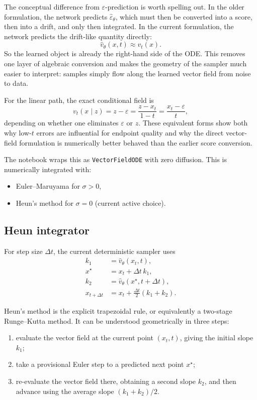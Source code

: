 \documentclass[11pt]{article}
\newcommand{\e}{\varepsilon}
\begin{document}
The conceptual difference from \(\varepsilon\)-prediction is worth spelling out. In the older formulation, the network predicts \(\hat\e_\theta\), which must then be converted into a score, then into a drift, and only then integrated. In the current formulation, the network predicts the drift-like quantity directly:
\begin{equation}
  \hat v_\theta(x,t) \approx v_t(x).
\end{equation}
So the learned object is already the right-hand side of the ODE. This removes one layer of algebraic conversion and makes the geometry of the sampler much easier to interpret: samples simply flow along the learned vector field from noise to data.

For the linear path, the exact conditional field is
\begin{equation}
  v_t(x\mid z)
  =
  z-\e
  =
  \frac{z-x_t}{1-t}
  =
  \frac{x_t-\e}{t},
\end{equation}
depending on whether one eliminates \(\e\) or \(z\). These equivalent forms show both why low-\(t\) errors are influential for endpoint quality and why the direct vector-field formulation is numerically better behaved than the earlier score conversion.

The notebook wraps this as \texttt{VectorFieldODE} with zero diffusion. This is numerically integrated with:
\begin{itemize}[leftmargin=1.5em]
  \item Euler--Maruyama for \(\sigma>0\),
  \item Heun's method for \(\sigma=0\) (current active choice).
\end{itemize}

\subsection{Heun integrator}

For step size \(\Delta t\), the current deterministic sampler uses
\begin{align}
  k_1 &= \hat v_\theta(x_t,t),\\
  x^\star &= x_t + \Delta t\, k_1,\\
  k_2 &= \hat v_\theta(x^\star, t+\Delta t),\\
  x_{t+\Delta t} &= x_t + \frac{\Delta t}{2}(k_1+k_2).
\end{align}

Heun's method is the explicit trapezoidal rule, or equivalently a two-stage Runge--Kutta method. It can be understood geometrically in three steps:
\begin{enumerate}[leftmargin=1.5em]
  \item evaluate the vector field at the current point \((x_t,t)\), giving the initial slope \(k_1\);
  \item take a provisional Euler step to a predicted next point \(x^\star\);
  \item re-evaluate the vector field there, obtaining a second slope \(k_2\), and then advance using the average slope \((k_1+k_2)/2\).
\end{enumerate}
\end{document}
